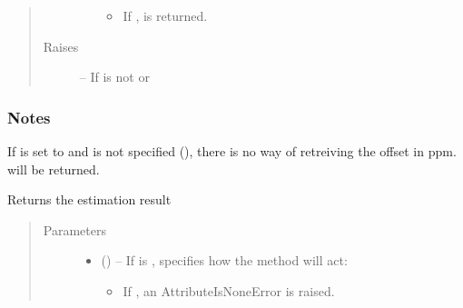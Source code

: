 \documentclass[letterpaper,10pt,english]{sphinxmanual}
\begin{document}
\begin{fulllineitems}
\begin{fulllineitems}
\begin{quote}
\begin{description}
\begin{itemize}
\begin{itemize}
\item {} 
\sphinxAtStartPar
If ,  is returned.

\end{itemize}

\end{itemize}


\item[{Raises}] \leavevmode
\sphinxAtStartPar
{\hyperref[\detokenize{references/errors:nmrespy._errors.InvalidUnitError}]{}} – If  is not  or 

\end{description}\end{quote}
\subsubsection*{Notes}

\sphinxAtStartPar
If  is set to  and  is not specified
(), there is no way of retreiving the offset in ppm.
 will be returned.

\end{fulllineitems}


\begin{fulllineitems}
\label{\detokenize{references/core:nmrespy.core.Estimator.get_result}}
\sphinxAtStartPar
Returns the estimation result
\begin{quote}\begin{description}
\item[{Parameters}] \leavevmode\begin{itemize}
\item {} 
\sphinxAtStartPar
{} (\sphinxstyleliteralemphasis{\sphinxupquote{, }}) – 
\sphinxAtStartPar
If  is ,  specifies how the method will
act:
\begin{itemize}
\item {} 
\sphinxAtStartPar
If , an AttributeIsNoneError is raised.


\end{itemize}
\end{itemize}
\end{description}
\end{quote}
\end{fulllineitems}
\end{fulllineitems}
\end{document}
